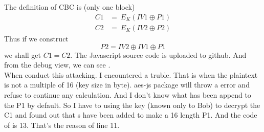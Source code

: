 \documentclass{article}
\begin{document}
\subsection{}
The definition of CBC is (only one block)
$$
	\begin{aligned}
		C1 & =\ E_K(IV1\oplus P1) \\
		C2 & =\ E_K(IV2\oplus P2)
	\end{aligned}
$$
Thus if we construct
$$P2 = IV2 \oplus IV1 \oplus P1$$
we shall get $C1 = C2$. The Javascript source code is uploaded to github. And from the debug view, we can see .\\
When conduct this attacking. I encountered a truble. That is when the plaintext is not a multiple of 16 (key size in byte). aes-js package will throw a error and refuse to continue any calculation. And I don't know what has been append to the P1 by default. So I have to using the key (known only to Bob) to decrypt the C1 and found out that s have been added to make a 16 length P1. And the code of  is 13. That's the reason of line 11.
\end{document}

